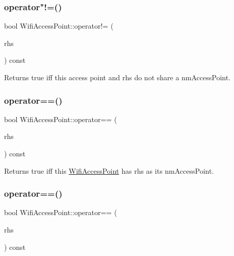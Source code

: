 \subsubsection{\texorpdfstring{operator"!=()}{operator!=()}\hspace{0.1cm}{\footnotesize\ttfamily [2/2]}}
{\footnotesize\ttfamily bool Wifi\+Access\+Point\+::operator!= (\begin{DoxyParamCaption}\item[{const \mbox{\hyperlink{classWifiAccessPoint}{Wifi\+Access\+Point}} \&}]{rhs }\end{DoxyParamCaption}) const}

Returns true iff this access point and rhs do not share a nm\+Access\+Point. \mbox{\label{classWifiAccessPoint_a6aea3985cd8b84de5e7cdf451dfc6fab}} 
\subsubsection{\texorpdfstring{operator==()}{operator==()}\hspace{0.1cm}{\footnotesize\ttfamily [1/2]}}
{\footnotesize\ttfamily bool Wifi\+Access\+Point\+::operator== (\begin{DoxyParamCaption}\item[{N\+M\+Access\+Point $\ast$}]{rhs }\end{DoxyParamCaption}) const}

Returns true iff this \mbox{\hyperlink{classWifiAccessPoint}{Wifi\+Access\+Point}} has rhs as its nm\+Access\+Point. \mbox{\label{classWifiAccessPoint_acdd95fb3f88e753efe7fe682f086e3db}} 
\subsubsection{\texorpdfstring{operator==()}{operator==()}\hspace{0.1cm}{\footnotesize\ttfamily [2/2]}}
{\footnotesize\ttfamily bool Wifi\+Access\+Point\+::operator== (\begin{DoxyParamCaption}\item[{const \mbox{\hyperlink{classWifiAccessPoint}{Wifi\+Access\+Point}} \&}]{rhs }\end{DoxyParamCaption}) const}

